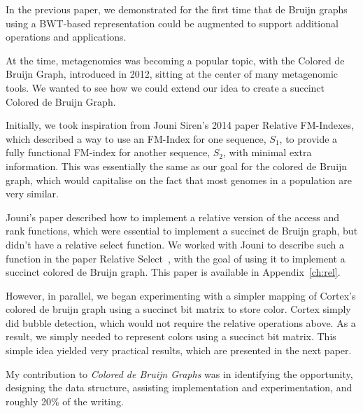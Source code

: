 In the previous paper, we demonstrated for the first time that de Bruijn graphs using a BWT-based representation could be augmented to support additional operations and applications.

At the time, metagenomics was becoming a popular topic, with the Colored de Bruijn Graph, introduced in 2012, sitting at the center of many metagenomic tools. We wanted to see how we could extend our idea to create a succinct Colored de Bruijn Graph.

Initially, we took inspiration from Jouni Siren's 2014 paper Relative FM-Indexes, which described a way to use an FM-Index for one sequence, $S_1$, to provide a fully functional FM-index for another sequence, $S_2$, with minimal extra information. This was essentially the same as our goal for the colored de Bruijn graph, which would capitalise on the fact that most genomes in a population are very similar.

Jouni's paper described how to implement a relative version of the access and rank functions, which were essential to implement a succinct de Bruijn graph, but didn't have a relative select function. We worked with Jouni to describe such a function in the paper Relative Select~\cite{boucher15}, with the goal of using it to implement a succinct colored de Bruijn graph. This paper is available in Appendix~\ref{ch:rel}.

However, in parallel, we began experimenting with a simpler mapping of Cortex's colored de bruijn graph using a succinct bit matrix to store color. Cortex simply did bubble detection, which would not require the relative operations above. As a result, we simply needed to represent colors using a succinct bit matrix. This simple idea yielded very practical results, which are presented in the next paper.

My contribution to \textit{Colored de Bruijn Graphs} was in identifying the opportunity, designing the data structure, assisting implementation and experimentation, and roughly 20\% of the writing.